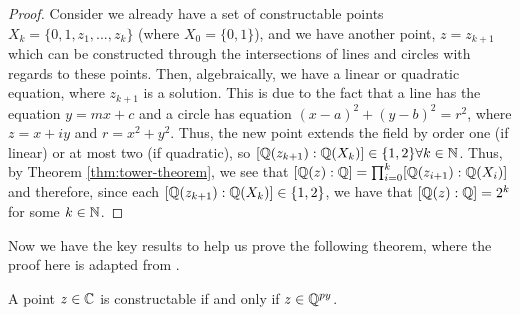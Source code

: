 \begin{proof}  
   Consider we already have a set of constructable points $X_k = \{0,1,z_1,...,z_k\}$ (where $X_0=\{0,1\}$), and we have another point, $z=z_{k+1}$ which can be constructed through the intersections of lines and circles with regards to these points. Then, algebraically, we have a linear or quadratic equation, where $z_{k+1}$ is a solution. This is due to the fact that a line has the equation $y=mx+c$ and a circle has equation $(x-a)^2+(y-b)^2=r^2$, where $z=x+iy$ and $r=x^2+y^2$. Thus, the new point extends the field by order one (if linear) or at most two (if quadratic), so $[\mathbb Q(z_{k+1}):\mathbb Q(X_k)] \in \{1,2\} \forall k \in \mathbb N$. Thus, by Theorem \ref{thm:tower-theorem}, we see that $[\mathbb Q(z):\mathbb Q] = \prod_{i=0}^k [\mathbb Q(z_{i+1}):\mathbb Q(X_i)]$ and therefore, since each $[\mathbb Q(z_{k+1}):\mathbb Q(X_k)] \in \{1,2\}$, we have that $[\mathbb Q(z):\mathbb Q] = 2^k$ for some $k \in \mathbb N$.
\end{proof}


Now we have the key results to help us prove the following theorem, where the proof here is adapted from \cite{constructions-and-galois}.

\begin{theorem}
    A point $z \in \mathbb C$ is constructable if and only if $z \in \mathbb Q^{py}$.
\end{theorem}

